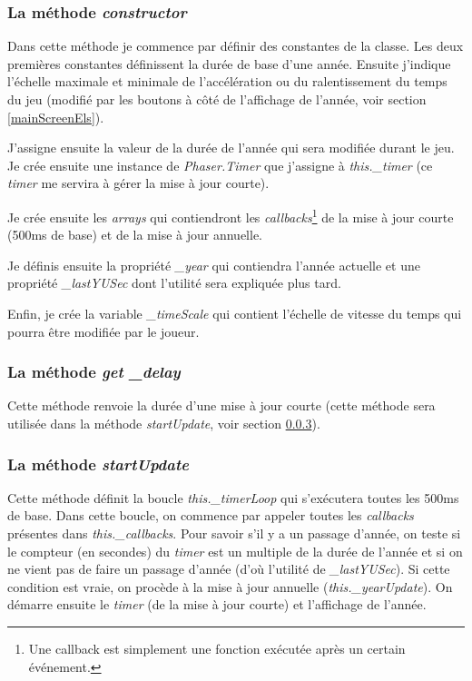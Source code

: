 \documentclass{article}
\begin{document}
		\subsubsection{La méthode \textit{constructor}}
		Dans cette méthode je commence par définir des constantes de la classe. Les deux premières constantes définissent la durée de base d'une année. Ensuite j'indique l'échelle maximale et minimale de l'accélération ou du ralentissement du temps du jeu (modifié par les boutons à côté de l'affichage de l'année, voir section \ref{mainScreenEls}).
		
		
		J'assigne ensuite la valeur de la durée de l'année qui sera modifiée durant le jeu. Je crée ensuite une instance de \textit{Phaser.Timer} que j'assigne à \textit{this.\_timer} (ce \textit{timer} me servira à gérer la mise à jour courte).
		
		Je crée ensuite les \textit{arrays} qui contiendront les \textit{callbacks}\footnote{Une callback est simplement une fonction exécutée après un certain événement.} de la mise à jour courte (500ms de base) et de la mise à jour annuelle. 
		
		
		Je définis ensuite la propriété \textit{\_year} qui contiendra l'année actuelle et une propriété \textit{\_lastYUSec} dont l'utilité sera expliquée plus tard.
		
		
		Enfin, je crée la variable \textit{\_timeScale} qui contient l'échelle de vitesse du temps qui pourra être modifiée par le joueur.
		
		\subsubsection{La méthode \textit{get \_delay}}
		Cette méthode renvoie la durée d'une mise à jour courte (cette méthode sera utilisée dans la méthode \textit{startUpdate}, voir section \ref{startUpdate}).
		
		\subsubsection{La méthode \textit{startUpdate}} \label{startUpdate}
		Cette méthode définit la boucle \textit{this.\_timerLoop} qui s'exécutera toutes les 500ms de base. Dans cette boucle, on commence par appeler toutes les \textit{callbacks} présentes dans \textit{this.\_callbacks}. 
		Pour savoir s'il y a un passage d'année, on teste si le compteur (en secondes) du \textit{timer} est un multiple de la durée de l'année et si on ne vient pas de faire un passage d'année (d'où l'utilité de \textit{\_lastYUSec}). Si cette condition est vraie, on procède à la mise à jour annuelle (\textit{this.\_yearUpdate}).
		On démarre ensuite le \textit{timer} (de la mise à jour courte) et l'affichage de l'année.
		
\end{document}
